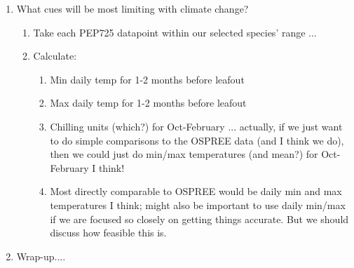 \documentclass[11pt,letterpaper]{article}
\renewcommand{\section}[1]{%
\bigskip
\begin{center}
\begin{Large}
\normalfont\scshape #1
\medskip
\end{Large}
\end{center}}
\begin{document}
\begin{enumerate}
\begin{enumerate}
\end{enumerate}
\item What cues will be most limiting with climate change?
\begin{enumerate}
\item Take each PEP725 datapoint within our selected species' range ... 
\item Calculate: 
\begin{enumerate}
\item Min daily temp for 1-2 months before leafout
\item Max daily temp for 1-2 months before leafout
\item Chilling units (which?) for Oct-February ... actually, if we just want to do simple comparisons to the OSPREE data (and I think we do), then we could just do min/max temperatures (and mean?) for Oct-February I think!
\item Most directly comparable to OSPREE would be daily min and max temperatures I think; might also be important to use daily min/max if we are focused so closely on getting things accurate. But we should discuss how feasible this is. 
\end{enumerate}
\end{enumerate}
\item Wrap-up....
\end{enumerate}






%
%


\end{document}
